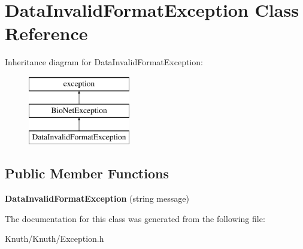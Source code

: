 \hypertarget{class_data_invalid_format_exception}{}\section{Data\+Invalid\+Format\+Exception Class Reference}
\label{class_data_invalid_format_exception}
Inheritance diagram for Data\+Invalid\+Format\+Exception\+:\begin{figure}[H]
\begin{center}
\leavevmode
\includegraphics[height=3.000000cm]{class_data_invalid_format_exception}
\end{center}
\end{figure}
\subsection*{Public Member Functions}
\begin{DoxyCompactItemize}
\item 
\mbox{\label{class_data_invalid_format_exception_a2d5a420fffae751946eb0750486a238f}} 
{\bfseries Data\+Invalid\+Format\+Exception} (string message)
\end{DoxyCompactItemize}


The documentation for this class was generated from the following file\+:\begin{DoxyCompactItemize}
\item 
Knuth/\+Knuth/Exception.\+h\end{DoxyCompactItemize}
